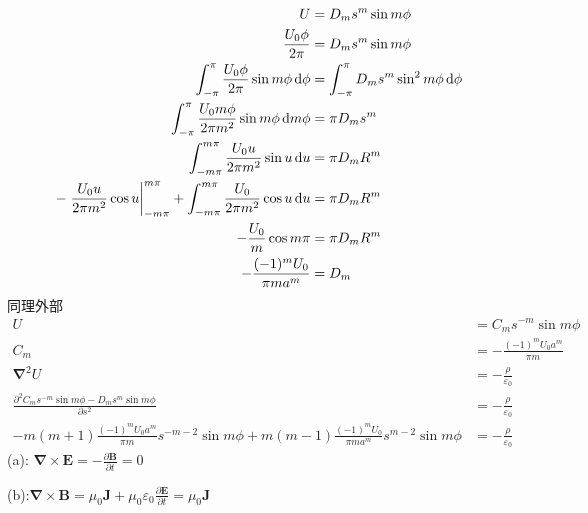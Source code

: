 \begin{align*}
    U&=D_ms^{m}\sin m\phi\\
    \frac{U_0\phi}{2\pi}&=D_ms^{m}\sin m\phi\\
    \int_{-\pi}^{\pi}\frac{U_0\phi}{2\pi}\sin m\phi\dif\phi&=\int_{-\pi}^{\pi}D_ms^{m}\sin^2 m\phi\dif\phi\\
    \int_{-\pi}^{\pi}\frac{U_0m\phi}{2\pi m^2}\sin m\phi\dif m\phi&=\pi D_ms^{m}\\
    \int_{-m\pi}^{m\pi}\frac{U_0u}{2\pi m^2}\sin u\dif u&=\pi D_mR^{m}\\
    -\left.\frac{U_0u}{2\pi m^2}\cos u\right|_{-m\pi}^{m\pi}
    +\int_{-m\pi}^{m\pi}\frac{U_0}{2\pi m^2}\cos u\dif u&=\pi D_mR^{m}\\
    -\frac{U_0}{m}\cos m\pi&=\pi D_mR^{m}\\
    -\frac{(-1)^mU_0}{\pi ma^{m}}&= D_m\\
\end{align*}
同理外部
\begin{align*}
    U&=C_ms^{-m}\sin m\phi\\
    C_m&=-\frac{(-1)^mU_0a^{m}}{\pi m}\\
    \boldsymbol{\nabla}^2U&=-\frac{\rho}{\varepsilon_0}\\
    \frac{\partial^2 C_ms^{-m}\sin m\phi-D_ms^{m}\sin m\phi}{\partial s^2}&=-\frac{\rho}{\varepsilon_0}\\
    -m(m+1)\frac{(-1)^mU_0a^{m}}{\pi m}s^{-m-2}\sin m\phi+
    m(m-1)\frac{(-1)^mU_0}{\pi ma^{m}}s^{m-2}\sin m\phi&=-\frac{\rho}{\varepsilon_0}
\end{align*}
(a):
    $\boldsymbol{\nabla}\times\boldsymbol{E}=-\frac{\partial \boldsymbol{B}}{\partial t}=0$

(b):$\boldsymbol{\nabla}\times\boldsymbol{B}=\mu_0\boldsymbol{J}+\mu_0\varepsilon_0\frac{\partial \boldsymbol{E}}{\partial t}=\mu_0\boldsymbol{J}$

